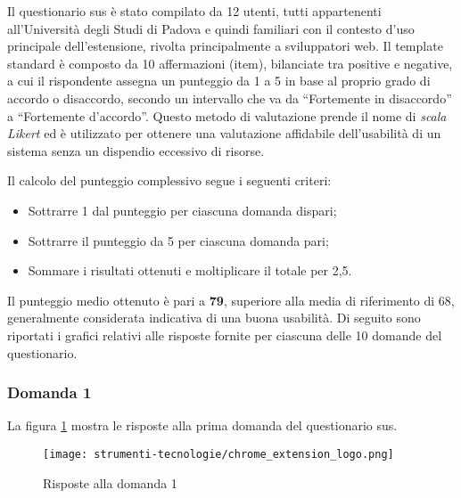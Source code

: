 \par Il questionario \gls{sus} è stato compilato da 12 utenti, tutti appartenenti all’Università degli Studi di Padova e quindi familiari con il contesto d’uso principale dell’estensione, rivolta principalmente a sviluppatori web. Il template standard è composto da 10 affermazioni (item), bilanciate tra positive e negative, a cui il rispondente assegna un punteggio da 1 a 5 in base al proprio grado di accordo o disaccordo, secondo un intervallo che va da “Fortemente in disaccordo” a “Fortemente d’accordo”. Questo metodo di valutazione prende il nome di \textit{scala Likert} ed è utilizzato per ottenere una valutazione affidabile dell’usabilità di un sistema senza un dispendio eccessivo di risorse.

\vspace{10pt}
\par\noindent Il calcolo del punteggio complessivo segue i seguenti criteri:
\begin{itemize}
  \item Sottrarre 1 dal punteggio per ciascuna domanda dispari;
  \item Sottrarre il punteggio da 5 per ciascuna domanda pari;
  \item Sommare i risultati ottenuti e moltiplicare il totale per 2,5. 
\end{itemize}

\vspace{5pt}
\par\noindent Il punteggio medio ottenuto è pari a \textbf{79}, superiore alla media di riferimento di 68, generalmente considerata indicativa di una buona usabilità. Di seguito sono riportati i grafici relativi alle risposte fornite per ciascuna delle 10 domande del questionario.

\subsubsection*{Domanda 1}

\vspace{5pt}
\begin{minipage}{\textwidth}
  \par\noindent La figura \ref{fig:sus_q1} mostra le risposte alla prima domanda del questionario \gls{sus}.
  \begin{figure}[H]
    \centering
    \texttt{[image: strumenti-tecnologie/chrome\_extension\_logo.png]} 
    \caption{Risposte alla domanda 1}
    \label{fig:sus_q1}
  \end{figure}
\end{minipage}

